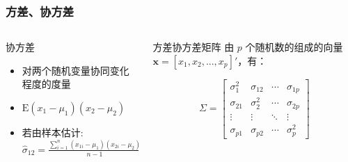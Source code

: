 \documentclass[serif,aspectratio=169]{beamer}
\begin{document}
\begin{frame}
  \frametitle{方差、协方差}
  \begin{columns}
    \begin{column}{.5\textwidth}
      \begin{block}{协方差}
        \begin{itemize}
        \item 对两个随机变量协同变化程度的度量
        \item $\mathrm{E}(x_1-\mu_1)(x_2-\mu_2)$
        \item 若由样本估计: $\displaystyle\hat{\sigma}_{12}=\frac{\sum_{i=1}^n(x_{1i}-\mu_1)(x_{2i}-\mu_2)}{n-1}$
        \end{itemize}
      \end{block}
    \end{column}

    \pause
    \begin{column}{.5\textwidth}
      \begin{block}{方差协方差矩阵}
        由 $p$ 个随机数的组成的向量 $\mathbf{x}=[x_1, x_2, ..., x_p]'$，有：
        
        $$
        \Sigma = \left[\begin{array}{llll}
            \sigma_1^2 & \sigma_{12} & \cdots & \sigma_{1p}\\
            \sigma_{21} & \sigma_2^2 & \cdots & \sigma_{2p}\\
            \vdots & \vdots & \ddots & \vdots\\
            \sigma_{p1} & \sigma_{p2} & \cdots & \sigma_p^2
          \end{array}\right]
        $$
        
      \end{block}
    \end{column}
  \end{columns}
\end{frame}
\end{document}
